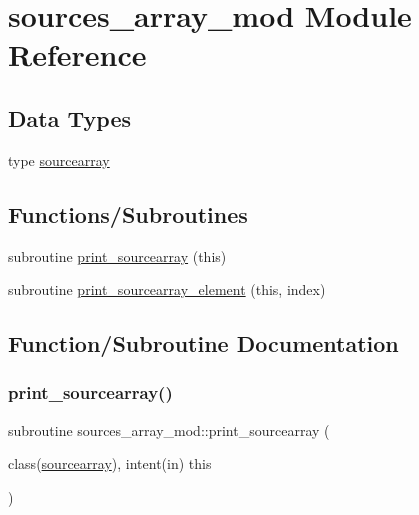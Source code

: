 \hypertarget{namespacesources__array__mod}{}\section{sources\+\_\+array\+\_\+mod Module Reference}
\label{namespacesources__array__mod}
\subsection*{Data Types}
\begin{DoxyCompactItemize}
\item 
type \hyperlink{structsources__array__mod_1_1sourcearray}{sourcearray}
\end{DoxyCompactItemize}
\subsection*{Functions/\+Subroutines}
\begin{DoxyCompactItemize}
\item 
subroutine \hyperlink{namespacesources__array__mod_aa2e56a704fb4483fff2b2bd65c8db8da}{print\+\_\+sourcearray} (this)
\item 
subroutine \hyperlink{namespacesources__array__mod_a83b399b5839262af19adcae73824874e}{print\+\_\+sourcearray\+\_\+element} (this, index)
\end{DoxyCompactItemize}


\subsection{Function/\+Subroutine Documentation}
\mbox{\label{namespacesources__array__mod_aa2e56a704fb4483fff2b2bd65c8db8da}} 
\subsubsection{\texorpdfstring{print\+\_\+sourcearray()}{print\_sourcearray()}}
{\footnotesize\ttfamily subroutine sources\+\_\+array\+\_\+mod\+::print\+\_\+sourcearray (\begin{DoxyParamCaption}\item[{class(\hyperlink{structsources__array__mod_1_1sourcearray}{sourcearray}), intent(in)}]{this }\end{DoxyParamCaption})\hspace{0.3cm}{\ttfamily [private]}}

